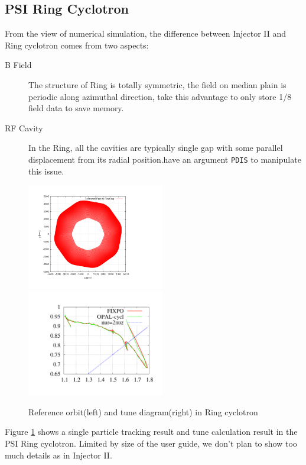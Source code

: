 \subsection{PSI  Ring Cyclotron}
\label{sec:Ring}
From the view of numerical simulation, the difference between Injector II and Ring cyclotron comes from two aspects:
\begin{description}
\item[B Field] The structure of Ring is totally symmetric, the field on median plain is periodic 
along azimuthal direction, \opalcycl take this advantage to only store 1/8 field data to save memory.

\item[RF Cavity] In the Ring, all the cavities are typically single gap with some parallel displacement from its
radial position.\opalcycl have an argument \texttt{PDIS} to manipulate this issue.  
\end{description}
\begin{figure}[ht]
  \begin{center} 
    \includegraphics[width=6cm,trim=2.5cm 2.5cm 2.5cm 2.5cm]{figures/cyclotron/AEO_Ring.png}
    \includegraphics[width=6cm,trim=2.5cm 2.5cm 2.5cm 2.5cm]{figures/cyclotron/nurnuz_Ring}
    \caption{Reference orbit(left) and tune diagram(right) in Ring cyclotron }
    \label{fig:Ring reference orbit and tune}
  \end{center}
\end{figure}
Figure \ref{fig:Ring reference orbit and tune} shows a single particle tracking result and tune calculation result in the PSI Ring cyclotron.
Limited by size of the user guide, we don't plan to show too much details as in Injector II.

